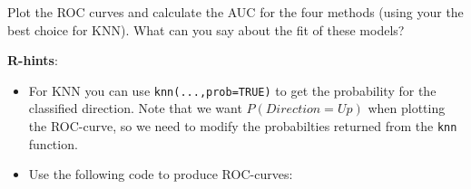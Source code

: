 \documentclass[
]{article}
\newenvironment{Shaded}{\begin{snugshade}}{\end{snugshade}}
\newcommand{\CommentTok}[1]{\textcolor[rgb]{0.56,0.35,0.01}{\textit{#1}}}
\newcommand{\DecValTok}[1]{\textcolor[rgb]{0.00,0.00,0.81}{#1}}
\newcommand{\FunctionTok}[1]{\textcolor[rgb]{0.13,0.29,0.53}{\textbf{#1}}}
\newcommand{\NormalTok}[1]{#1}
\newcommand{\OtherTok}[1]{\textcolor[rgb]{0.56,0.35,0.01}{#1}}
\newcommand{\SpecialCharTok}[1]{\textcolor[rgb]{0.81,0.36,0.00}{\textbf{#1}}}
\newcommand{\StringTok}[1]{\textcolor[rgb]{0.31,0.60,0.02}{#1}}
\providecommand{\tightlist}{%
  \setlength{\itemsep}{0pt}\setlength{\parskip}{0pt}}
\begin{document}
Plot the ROC curves and calculate the AUC for the four methods (using
your the best choice for KNN). What can you say about the fit of these
models?

\textbf{R-hints}:

\begin{itemize}
\tightlist
\item
  For KNN you can use \texttt{knn(...,prob=TRUE)} to get the probability
  for the classified direction. Note that we want \(P(Direction = Up)\)
  when plotting the ROC-curve, so we need to modify the probabilties
  returned from the \texttt{knn} function.
\end{itemize}

\begin{Shaded}
\end{Shaded}

\begin{itemize}
\tightlist
\item
  Use the following code to produce ROC-curves:
\end{itemize}
\end{document}
